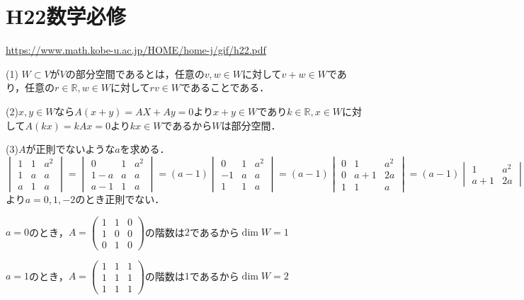 \documentclass[
		book,
		head_space=20mm,
		foot_space=20mm,
		gutter=10mm,
		line_length=190mm
]{jlreq}
\begin{document}
\section{H22数学必修}
\url{https://www.math.kobe-u.ac.jp/HOME/home-j/gif/h22.pdf}

(1)
$W\subset V$が$V$の部分空間であるとは，任意の$v,w \in W$に対して$v+w\in W$であり，任意の$r \in \mathbb{R},w \in W$に対して$rv\in W$であることである．

(2)$x,y \in W$なら$A(x+y)=AX+Ay=0$より$x+y \in W$であり$k \in \mathbb{R},x \in W$に対して$A(kx)=kAx=0$より$kx \in W$であるから$W$は部分空間．

(3)$A$が正則でないような$a$を求める．
$\begin{vmatrix}
    1 & 1 & a^2 \\
    1 &a & a \\
    a & 1 & a
\end{vmatrix}=\begin{vmatrix}
    0 & 1 & a^2 \\
    1-a & a & a \\
    a-1 & 1 & a
\end{vmatrix}=(a-1)\begin{vmatrix}
    0 & 1 & a^2 \\
    -1 & a & a \\
    1 & 1 & a
\end{vmatrix}=(a-1)\begin{vmatrix}
    0 & 1 & a^2 \\
    0 & a+1 & 2a \\
    1 & 1 & a
\end{vmatrix}=(a-1)\begin{vmatrix}
    1 & a^2 \\
    a+1 & 2a
\end{vmatrix}=(a-1)(2a-a^2(a+1))=-a(a-1)^2(a+2)$
より$a=0,1,-2$のとき正則でない．

$a=0$のとき，$A=\begin{pmatrix}
    1 & 1 & 0 \\
    1 & 0 & 0 \\
    0 & 1 & 0
\end{pmatrix}$の階数は$2$であるから$\dim W=1$

$a=1$のとき，$A=\begin{pmatrix}
    1 & 1 & 1 \\
    1 & 1 & 1 \\
    1 & 1 & 1
\end{pmatrix}$の階数は$1$であるから$\dim W=2$
\end{document}
